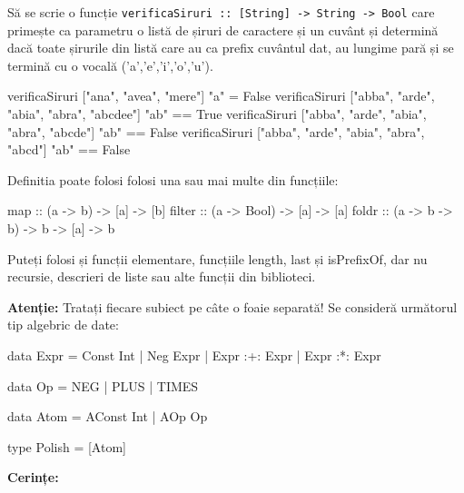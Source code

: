 \documentclass[addpoints,12pt,a4paper]{exam}
\begin{document}
\begin{questions}
\begin{parts}
Să se scrie o funcție \lstinline$verificaSiruri :: [String] -> String -> Bool$ care primește ca parametru o listă de șiruri de caractere și un cuvânt și determină dacă toate șirurile din listă care au ca prefix cuvântul dat, au lungime pară și se termină cu o vocală ('a','e','i','o','u').
\begin{asciihs}
  verificaSiruri ["ana", "avea", "mere"] "a" = False
  verificaSiruri ["abba", "arde", "abia", "abra", "abcdee"] "ab" == True
  verificaSiruri ["abba", "arde", "abia", "abra", "abcde"] "ab" == False
  verificaSiruri ["abba", "arde", "abia", "abra", "abcd"] "ab" == False
\end{asciihs}
Definitia poate folosi folosi una sau mai multe din funcțiile:
\begin{asciihs}
  map :: (a -> b) -> [a] -> [b]
  filter :: (a -> Bool) -> [a] -> [a]
  foldr :: (a -> b -> b) -> b -> [a] -> b
\end{asciihs}
Puteți folosi și funcții elementare, funcțiile length, last și isPrefixOf,  dar nu recursie, descrieri de liste sau alte funcții din biblioteci.
\end{parts}

\noindent\textbf{Atenție:} Tratați fiecare subiect pe câte o foaie separată!
\question[3] 
Se consideră următorul tip algebric de date:
\begin{asciihs}
  data Expr = Const Int
            | Neg Expr
            | Expr :+: Expr
            | Expr :*: Expr
            
  data Op = NEG | PLUS | TIMES

  data Atom = AConst Int | AOp Op

  type Polish = [Atom]
\end{asciihs}

\newpage \textbf{Cerințe:}
\end{questions}
\end{document}
